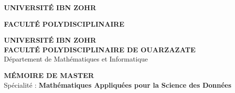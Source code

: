\documentclass[12pt,a4paper]{report}
\begin{document}
\begin{titlepage}
    \centering
    
    \begin{minipage}[t]{0.3\textwidth}
        \centering
        \textbf{\color{blueuniv}UNIVERSITÉ IBN ZOHR}
    \end{minipage}%
    \hfill
    \begin{minipage}[t]{0.3\textwidth}
        \centering
        \textbf{\color{blueuniv}FACULTÉ POLYDISCIPLINAIRE}
    \end{minipage}
    
    \vspace{1cm}
    
    {\large \textbf{\color{blueuniv}UNIVERSITÉ IBN ZOHR}}\\
    \vspace{0.3cm}
    {\large \textbf{FACULTÉ POLYDISCIPLINAIRE DE OUARZAZATE}}\\
    \vspace{0.2cm}
    {\normalsize Département de Mathématiques et Informatique}\\
    
    \vspace{1.5cm}
    
    {\Large \textbf{\color{blueuniv}MÉMOIRE DE MASTER}}\\
    \vspace{0.5cm}
    {\large Spécialité : \textbf{Mathématiques Appliquées pour la Science des Données}}\\
    
    \vspace{2cm}
    
    \begin{center}
    \end{center}
    

\end{titlepage}
\end{document}
